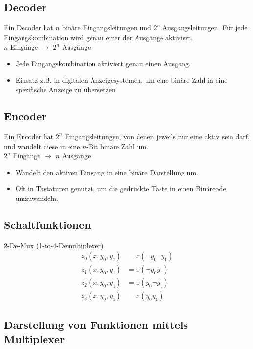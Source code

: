 \documentclass[a4paper,6pt]{article}
\begin{document}
\begin{multicols*}{3}
\subsection*{Decoder}
Ein Decoder hat $ n $ binäre Eingangsleitungen und $ 2^n $ Ausgangsleitungen. Für jede Eingangskombination wird genau einer der Ausgänge aktiviert. \\
$ n $ Eingänge $ \rightarrow $ $ 2^n $ Ausgänge
\begin{itemize}
    \item Jede Eingangskombination aktiviert genau einen Ausgang.
    \item Einsatz z.B. in digitalen Anzeigesystemen, um eine binäre Zahl in eine spezifische Anzeige zu übersetzen.
\end{itemize}

\subsection*{Encoder}
Ein Encoder hat $ 2^n $ Eingangsleitungen, von denen jeweils nur eine aktiv sein darf, und wandelt diese in eine $ n $-Bit binäre Zahl um. \\
$ 2^n $ Eingänge $ \rightarrow $ $ n $ Ausgänge
\begin{itemize}
    \item Wandelt den aktiven Eingang in eine binäre Darstellung um.
    \item Oft in Tastaturen genutzt, um die gedrückte Taste in einen Binärcode umzuwandeln.
\end{itemize}

\subsection*{Schaltfunktionen}

2-De-Mux (1-to-4-Demultiplexer)
\begin{align*}
    z_0 (x, y_0, y_1) &= x (\neg y_0 \neg y_1) \\
    z_1 (x, y_0, y_1) &= x (\neg y_0 y_1) \\
    z_2 (x, y_0, y_1) &= x ( y_0 \neg y_1) \\
    z_3 (x, y_0, y_1) &= x ( y_0  y_1) 
\end{align*}

\subsection*{Darstellung von Funktionen mittels Multiplexer}


\end{multicols*}
\end{document}
